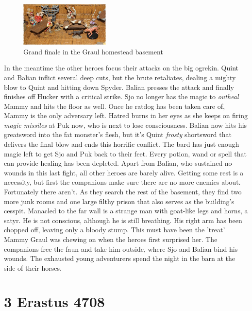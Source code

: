 \begin{figure}[h]
	\centering
	\includegraphics[width=0.4\textwidth]{images/Grand-finale-in-the-Graul-homestead-basement-512310881_mod.jpg}
	\caption{Grand finale in the Graul homestead basement}
	\label{fig:Grand-finale-in-the-Graul-homestead-basement-512310881}
\end{figure}

In the meantime the other heroes focus their attacks on the big ogrekin. Quint and Balian inflict several deep cuts, but the brute retaliates, dealing a mighty blow to Quint and hitting down Spyder. Balian presses the attack and finally finishes off Hucker with a critical strike. Sjo no longer has the magic to {\itshape outheal} Mammy and hits the floor as well. Once he ratdog has been taken care of, Mammy is the only adversary left. Hatred burns in her eyes as she keeps on firing  {\itshape magic missiles} at Puk now, who is next to lose consciousness. Balian now hits his greatsword into the fat monster's flesh, but it's Quint  {\itshape frosty} shortsword that delivers the final blow and ends this horrific conflict. The bard has just enough magic left to get Sjo and Puk back to their feet. Every potion, wand or spell that can provide healing has been depleted. Apart from Balian, who sustained no wounds in this last fight, all other heroes are barely alive. Getting some rest is a necessity, but first the companions make sure there are no more enemies about. Fortunately there aren't. As they search the rest of the basement, they find two more junk rooms and one large filthy prison that also serves as the building's cesspit. Manacled to the far wall is a strange man with goat-like legs and horns, a satyr. He is not conscious, although he is still breathing. His right arm has been chopped off, leaving only a bloody stump. This must have been the 'treat' Mammy Graul was chewing on when the heroes first surprised her. The companions free the faun and take him outside, where Sjo and Balian bind his wounds. The exhausted young adventurers spend the night in the barn at the side of their horses.\\

\section{3 Erastus 4708}

